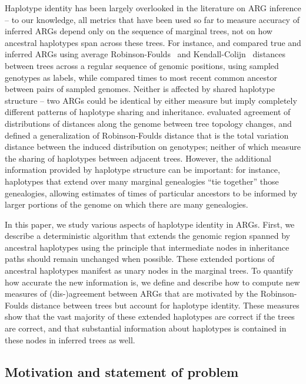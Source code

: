 \documentclass[10pt,twoside,lineno]{gsajnl}
\begin{document}
Haplotype identity has been largely overlooked in the literature on ARG inference --
to our knowledge, all metrics that have been used so far to measure accuracy of inferred ARGs
depend only on the sequence of marginal trees,
not on how ancestral haplotypes span across these trees.
For instance, \citet{kelleher2019inferring} and \citet{zhang2023biobankscale}
compared true and inferred ARGs
using average Robinson-Foulds~\citep{robinson1981comparison} and 
Kendall-Colijn~\citep{kendall2016mapping} distances between trees
across a regular sequence of genomic positions,
using sampled genotypes as labels,
while \citet{brandt2022evaluation} compared times to most recent common ancestor
between pairs of sampled genomes.
Neither is affected by shared haplotype structure --
two ARGs could be identical by either measure
but imply completely different patterns of haplotype sharing and inheritance.
\citet{deng2021distribution} evaluated agreement of distributions of
distances along the genome between tree topology changes,
and \citet{zhang2023biobankscale} defined a generalization of Robinson-Foulds distance
that is the total variation distance between the induced distribution on genotypes;
neither of which measure the sharing of haplotypes between adjacent trees.
However, the additional information provided by haplotype structure can be important:
for instance, haplotypes that extend over many marginal genealogies
``tie together'' those genealogies, allowing estimates of times of particular ancestors
to be informed by larger portions of the genome on which there are many genealogies.

In this paper, we study various aspects of haplotype identity in ARGs.
First, we describe a deterministic algorithm that
extends the genomic region spanned by ancestral haplotypes
using the principle that intermediate nodes in inheritance paths
should remain unchanged when possible.
These extended portions of ancestral haplotypes manifest as unary nodes in the marginal trees.
To quantify how accurate the new information is,
we define and describe how to compute new measures of (dis-)agreement between ARGs
that are motivated by the Robinson-Foulds distance between trees
but account for haplotype identity.
These measures show that the vast majority of these extended haplotypes are correct if the trees are correct,
and that substantial information about haplotypes is contained in these nodes
in inferred trees as well.


\subsection{Motivation and statement of problem}
\end{document}
